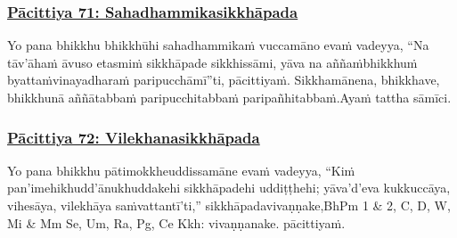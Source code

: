 \subsubsection*{\hyperref[exp71]{Pācittiya 71: Sahadhammikasikkhāpada}}
\label{pac71}

Yo pana bhikkhu bhikkhūhi sahadhammikaṁ vuccamāno evaṁ vadeyya, ``Na tāv'āhaṁ āvuso etasmiṁ sikkhāpade sikkhissāmi, yāva na aññaṁ\makeatletter\hyperlink{endnote380-appendix}\makeatother \thinspace bhikkhuṁ byattaṁ\makeatletter\hyperlink{endnote381-appendix}\makeatother \thinspace vinayadharaṁ paripucchāmī''ti, pācittiyaṁ. Sikkhamānena, bhikkhave, bhikkhunā aññātabbaṁ paripucchitabbaṁ paripañhitabbaṁ.\makeatletter\hyperlink{endnote382-appendix}\makeatother \thinspace Ayaṁ tattha sāmīci.



\subsubsection*{\hyperref[exp72]{Pācittiya 72: Vilekhanasikkhāpada}}
\label{pac72}

Yo pana bhikkhu pātimokkhe\makeatletter\hyperlink{endnote383-appendix}\makeatother \thinspace uddissamāne evaṁ vadeyya, ``Kiṁ pan'imehi\makeatletter\hyperlink{endnote384-appendix}\makeatother \thinspace khudd'ānukhuddakehi sikkhāpadehi uddiṭṭhehi; yāva'd'eva kukkuccāya, vihesāya, vilekhāya saṁvattantī'ti,'' sikkhāpadavivaṇṇake,\makeatletter\hyperlink{endnote385-appendix}\makeatother \thinspace BhPm 1 \& 2, C, D, W, Mi \& Mm Se, Um, Ra, Pg, Ce Kkh: vivaṇṇanake. pācittiyaṁ.



